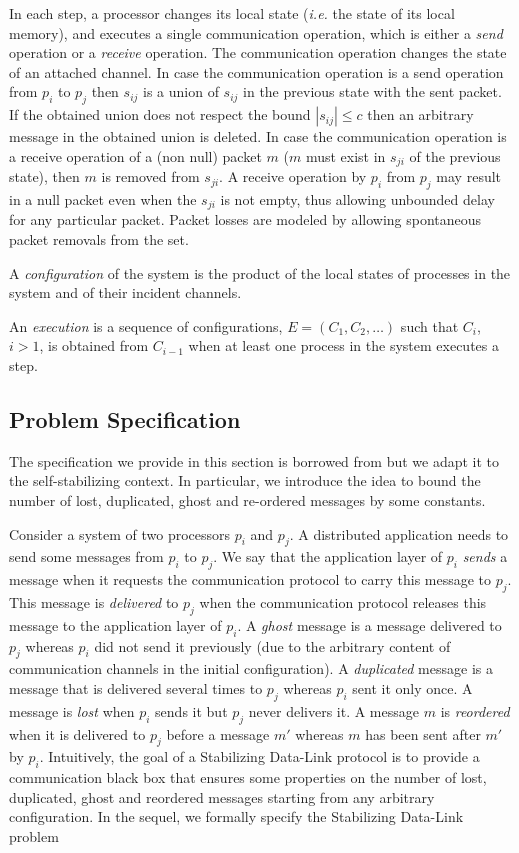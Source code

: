 \documentclass[11pt]{article}
\begin{document}
In each step, a processor changes its local state (\emph{i.e.} the state of its local memory), and executes a single communication operation, which is either a {\em send}  operation or a {\em receive} operation. The communication operation changes the state of an attached channel. In case the communication operation is a send operation from $p_i$ to $p_j$ then $s_{ij}$ is a union of $s_{ij}$ in the previous state with the sent packet. If the obtained union does not respect the bound $|s_{ij}|\leq c$ then an arbitrary message in the obtained union is deleted. In case the communication operation is a receive operation of a (non null) packet $m$ ($m$ must exist in $s_{ji}$ of the previous state), then $m$ is removed from $s_{ji}$. A receive operation by $p_i$ from $p_j$ may result in a null packet even when the $s_{ji}$ is not empty, thus allowing unbounded delay for any particular packet. Packet losses are modeled by allowing spontaneous packet removals from the set.
 
A \emph{configuration} of the system is the product of the local states of processes in the system and of their incident channels.

An {\em execution} is a sequence of configurations, $E=(C_1,C_2,\ldots)$ such that $C_i$, $i>1$, is obtained from $C_{i-1}$ when at least one process in the system executes a step.

\subsection{Problem Specification}\label{sub:specification}

The specification we provide in this section is borrowed from \cite{L96b} but we adapt it to the self-stabilizing context. In particular, we introduce the idea to bound the number of lost, duplicated, ghost and re-ordered messages by some constants.

Consider a system of two processors $p_i$ and $p_j$. A distributed application needs to send some messages from $p_i$ to $p_j$. We say that the application layer of $p_i$ \emph{sends} a message when it requests the communication protocol to carry this message to $p_j$. This message is \emph{delivered} to $p_j$ when the communication protocol releases this message to the application layer of $p_i$. A \emph{ghost} message is a message delivered to $p_j$ whereas $p_i$ did not send it previously (due to the arbitrary content of communication channels in the initial configuration). A \emph{duplicated} message is a message that is delivered several times to $p_j$ whereas $p_i$ sent it only once. A message is \emph{lost} when $p_i$ sends it but $p_j$ never delivers it. A message $m$ is \emph{reordered} when it is delivered to $p_j$ before a message $m'$ whereas $m$ has been sent after $m'$ by $p_i$. Intuitively, the goal of a Stabilizing Data-Link protocol is to provide a communication black box that ensures some properties on the number of lost, duplicated, ghost and reordered messages starting from any arbitrary configuration. In the sequel, we formally specify the Stabilizing Data-Link problem
\end{document}
